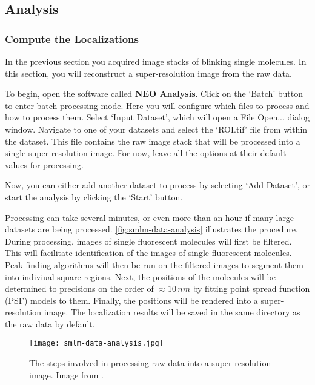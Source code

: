 \documentclass[10pt,a4paper,oneside]{book}
\begin{document}
\subsection{Analysis}

\subsubsection{Compute the Localizations}

In the previous section you acquired image stacks of blinking single molecules. In this section, you will reconstruct a super-resolution image from the raw data.

To begin, open the software called \textbf{NEO Analysis}. Click on the `Batch' button to enter batch processing mode. Here you will configure which files to process and how to process them. Select `Input Dataset', which will open a File Open... dialog window. Navigate to one of your datasets and select the `ROI.tif' file from within the dataset. This file contains the raw image stack that will be processed into a single super-resolution image. For now, leave all the options at their default values for processing.

Now, you can either add another dataset to process by selecting `Add Dataset', or start the analysis by clicking the `Start' button.

Processing can take several minutes, or even more than an hour if many large datasets are being processed. \autoref{fig:smlm-data-analysis} illustrates the procedure. During processing, images of single fluorescent molecules will first be filtered. This will facilitate identification of the images of single fluorescent molecules. Peak finding algorithms will then be run on the filtered images to segment them into indiviual square regions. Next, the positions of the molecules will be determined to precisions on the order of $\approx 10 \, nm$ by fitting point spread function (PSF) models to them. Finally, the positions will be rendered into a super-resolution image. The localization results will be saved in the same directory as the raw data by default.

\begin{figure}
    \centering
    \texttt{[image: smlm-data-analysis.jpg]}
    \caption{The steps involved in processing raw data into a super-resolution image. Image from \cite{martens-frontiersinbioinformatics-2022}.}
    \label{fig:smlm-data-analysis}
\end{figure}
\end{document}

